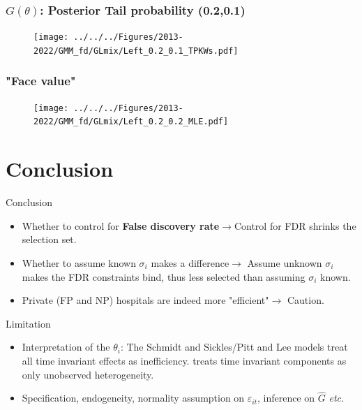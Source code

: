 \documentclass[10pt, aspectratio=169]{beamer}
\begin{document}
\begin{frame}[label=tpselect]
  \frametitle{$G(\theta)$: Posterior Tail probability (0.2,0.1)}
  \begin{figure}
    \centering
    \texttt{[image: ../../../Figures/2013-2022/GMM\_fd/GLmix/Left\_0.2\_0.1\_TPKWs.pdf]}
  \end{figure}
  \hyperlink{tpcontour}{}
\end{frame}

\begin{frame}
  \frametitle{"Face value"}
  \begin{figure}
    \centering
    \texttt{[image: ../../../Figures/2013-2022/GMM\_fd/GLmix/Left\_0.2\_0.2\_MLE.pdf]}
  \end{figure}
\end{frame}

\section{Conclusion}

\begin{frame}{Conclusion}
  \begin{itemize}
    \item Whether to control for \textbf{False discovery rate}$\rightarrow$Control for
          FDR shrinks the selection set.
    \item Whether to assume known $\sigma_i$ makes a difference$\rightarrow$ Assume
          unknown $\sigma_i$ makes the FDR constraints bind, thus less selected than
          assuming $\sigma_i$ known.
    \item Private (FP and NP) hospitals are indeed more "efficient"$\rightarrow$ Caution.
  \end{itemize}
\end{frame}

\begin{frame}[label=limitation]{Limitation}
  \begin{itemize}\itemsep=12pt
    \item Interpretation of the $\theta_i$: The Schmidt and Sickles/Pitt and Lee models
          treat all time invariant effects as inefficiency. \citet{greene2005fixed}
          treats time invariant components as only unobserved heterogeneity.
    \item Specification, endogeneity, normality assumption on $\varepsilon_{it}$,
          inference on $\hat{G}$ \textit{etc.}
          \hyperlink{normality}{} \end{itemize}
\end{frame}
\end{document}
